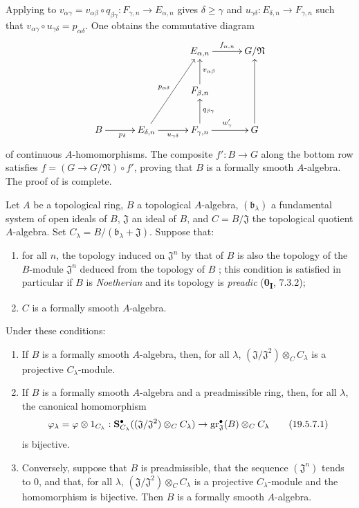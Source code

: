 \begin{env}[19.5.6.8]
Applying  to
$v_{\alpha\gamma}=v_{\alpha\beta}\circ q_{\beta\gamma}:F_{\gamma,n}\to E_{\alpha,n}$
gives $\delta\geq\gamma$ and $u_{\gamma\delta}:E_{\delta,n}\to F_{\gamma,n}$ such that
$v_{\alpha\gamma}\circ u_{\gamma\delta}=p_{\alpha\delta}$.
One obtains the commutative diagram
\[
\xymatrix@C=3em@R=2.5em{
  && E_{\alpha,n} \ar[r]^{f_{\alpha,n}} & G/\mathfrak N \\
  && F_{\beta,n} \ar[u]_{v_{\alpha\beta}} & \\
  B \ar[r]_{p_\delta} & E_{\delta,n} \ar[uur]^{p_{\alpha\delta}} \ar[r]_{u_{\gamma\delta}} & F_{\gamma,n} \ar[u]_{q_{\beta\gamma}} \ar[r]^{w'_\gamma} & G \ar[uu]
}
\]
of continuous $A$-homomorphisms.
The composite $f':B\to G$ along the bottom row satisfies $f=(G\to G/\mathfrak N)\circ f'$, proving that $B$ is a formally smooth $A$-algebra.
The proof of  is complete.
\end{env}

\begin{corollary}[19.5.7]
\label{0.19.5.7}
Let $A$ be a topological ring, $B$ a topological $A$-algebra, $(\mathfrak{b}_\lambda)$ a fundamental system of open ideals of $B$, $\mathfrak{J}$ an ideal of $B$, and $C=B/\mathfrak{J}$ the topological quotient $A$-algebra.
Set $C_\lambda=B/(\mathfrak{b}_\lambda+\mathfrak{J})$.
Suppose that:
\begin{enumerate}
  \item[$1^\circ$] for all $n$, the topology induced on $\mathfrak{J}^n$ by that of $B$ is also the topology of the $B$-module $\mathfrak{J}^n$ deduced from the topology of $B$ ; \textup{this condition is satisfied in particular if $B$ is \emph{Noetherian} and its topology is \emph{preadic} (\textbf{0\textsubscript{I}}, 7.3.2)};
  \item[$2^\circ$] $C$ is a formally smooth $A$-algebra.
\end{enumerate}
Under these conditions:
\begin{enumerate}
  \item[\rm(i)] If $B$ is a formally smooth $A$-algebra, then, for all $\lambda$, $(\mathfrak{J}/\mathfrak{J}^2)\otimes_C C_\lambda$ is a projective $C_\lambda$-module.
  \item[\rm(ii)] If $B$ is a formally smooth $A$-algebra and a preadmissible ring, then, for all $\lambda$, the canonical homomorphism
  \[
    \label{0.19.5.7.1}
    \varphi_\lambda=\varphi\otimes 1_{C_\lambda}:
    \mathbf{S}_{C_\lambda}^\bullet((\mathfrak{J}/\mathfrak{J}^2)\otimes_C C_\lambda)
    \to \operatorname{gr}_\mathfrak{J}^\bullet(B)\otimes_C C_\lambda
    \tag{19.5.7.1}
  \]
  is bijective.
  \item[\rm(iii)] Conversely, suppose that $B$ is preadmissible, that the sequence $(\mathfrak{J}^n)$ tends to $0$, and that, for all $\lambda$, $(\mathfrak{J}/\mathfrak{J}^2)\otimes_C C_\lambda$ is a projective $C_\lambda$-module and the homomorphism  is bijective.
  Then $B$ is a formally smooth $A$-algebra.
\end{enumerate}
\end{corollary}

